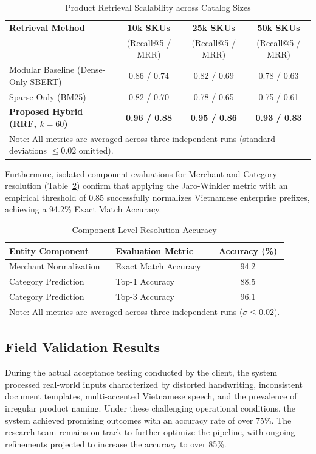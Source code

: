 \begin{table}[htbp]
    \centering
    \caption{Product Retrieval Scalability across Catalog Sizes}
    \label{tab:retrieval}
    \renewcommand{\arraystretch}{1.2}
    \begin{tabular}{l ccc}
        \hline
        \textbf{Retrieval Method} & \textbf{10k SKUs} & \textbf{25k SKUs} & \textbf{50k SKUs} \\
        & (Recall@5 / MRR) & (Recall@5 / MRR) & (Recall@5 / MRR) \\
        \hline
        Modular Baseline (Dense-Only SBERT) & 0.86 / 0.74 & 0.82 / 0.69 & 0.78 / 0.63 \\
        Sparse-Only (BM25) & 0.82 / 0.70 & 0.78 / 0.65 & 0.75 / 0.61 \\
        \textbf{Proposed Hybrid (RRF, $k=60$)} & \textbf{0.96 / 0.88} & \textbf{0.95 / 0.86} & \textbf{0.93 / 0.83} \\
        \hline
        \multicolumn{4}{l}{\footnotesize Note: All metrics are averaged across three independent runs (standard deviations $\le 0.02$ omitted).}
    \end{tabular}
\end{table}

Furthermore, isolated component evaluations for Merchant and Category resolution (Table~\ref{tab:components}) confirm that applying the Jaro-Winkler metric with an empirical threshold of 0.85 successfully normalizes Vietnamese enterprise prefixes, achieving a 94.2\% Exact Match Accuracy.

\begin{table}[htbp]
    \centering
    \caption{Component-Level Resolution Accuracy}
    \label{tab:components}
    \renewcommand{\arraystretch}{1.2}
    \begin{tabular}{llc}
        \hline
        \textbf{Entity Component} & \textbf{Evaluation Metric} & \textbf{Accuracy (\%)} \\
        \hline
        Merchant Normalization & Exact Match Accuracy & 94.2 \\
        Category Prediction & Top-1 Accuracy & 88.5 \\
        Category Prediction & Top-3 Accuracy & 96.1 \\
        \hline
        \multicolumn{3}{l}{\footnotesize Note: All metrics are averaged across three independent runs ($\sigma \le 0.02$).}
    \end{tabular}
\end{table}

\subsection{Field Validation Results}
During the actual acceptance testing conducted by the client, the system processed real-world inputs characterized by distorted handwriting, inconsistent document templates, multi-accented Vietnamese speech, and the prevalence of irregular product naming. Under these challenging operational conditions, the system achieved promising outcomes with an accuracy rate of over 75\%. The research team remains on-track to further optimize the pipeline, with ongoing refinements projected to increase the accuracy to over 85\%.

